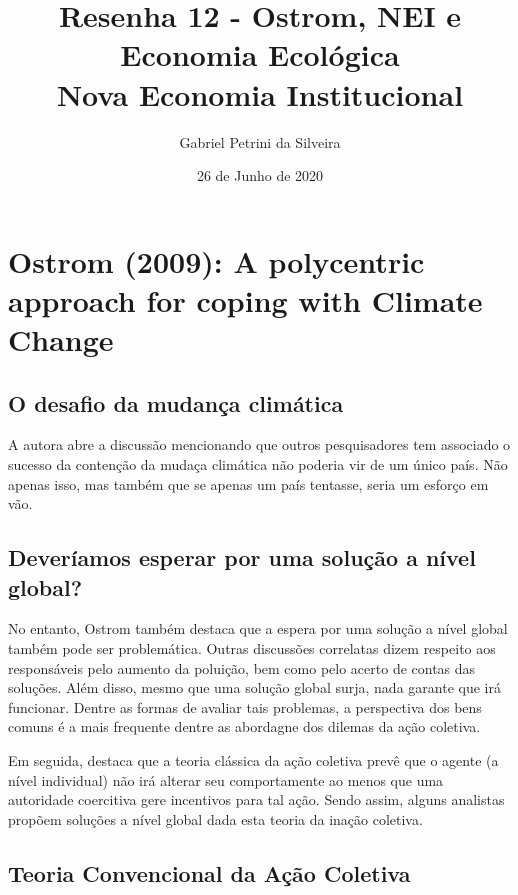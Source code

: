 \documentclass[11pt]{article}
\author{Gabriel Petrini da Silveira}
\date{26 de Junho de 2020}
\title{Resenha 12 - Ostrom, NEI e Economia Ecológica\\\medskip
\large Nova Economia Institucional}
\begin{document}
\maketitle
\tableofcontents

\section{Ostrom (2009): A polycentric approach for coping with Climate Change}
\label{sec:org0b5b182}

\subsection{O desafio da mudança climática}
\label{sec:org79b974c}

A autora abre a discussão mencionando que outros pesquisadores tem associado o sucesso da contenção da mudaça climática não poderia vir de um único país.
Não apenas isso, mas também que se apenas um país tentasse, seria um esforço em vão.

\subsection{Deveríamos esperar por uma solução a nível global?}
\label{sec:org0127f5b}

No entanto, Ostrom também destaca que a espera por uma solução a nível global também pode ser problemática.
Outras discussões correlatas dizem respeito aos responsáveis pelo aumento da poluição, bem como pelo acerto de contas das soluções.
Além disso, mesmo que uma solução global surja, nada garante que irá funcionar.
Dentre as formas de avaliar tais problemas, a perspectiva dos bens comuns é a mais frequente dentre as abordagne dos dilemas da ação coletiva.


Em seguida, destaca que a teoria clássica da ação coletiva prevê que o agente (a nível individual) não irá alterar seu comportamente ao menos que uma autoridade coercitiva gere incentivos para tal ação.
Sendo assim, alguns analistas propõem soluções a nível global dada esta teoria da inação coletiva.

\subsection{Teoria Convencional da Ação Coletiva}
\label{sec:org5daa007}
\end{document}
